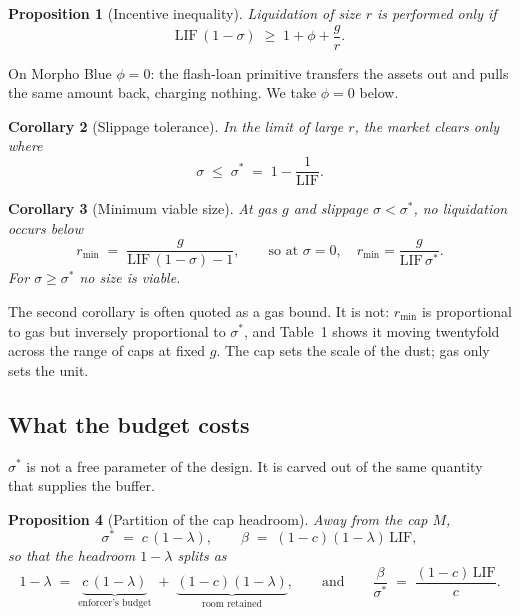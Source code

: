 \documentclass[11pt,a4paper]{article}
\theoremstyle{plain}
\newtheorem{proposition}{Proposition}
\newtheorem{corollary}[proposition]{Corollary}
\theoremstyle{definition}
\theoremstyle{remark}
\newcommand{\LIF}{\mathrm{LIF}}
\begin{document}
\begin{proposition}[Incentive inequality]\label{prop:frontier}
Liquidation of size $r$ is performed only if
\begin{equation}\label{eq:frontier}
  \LIF\,(1-\sigma) \;\geq\; 1+\phi+\frac{g}{r}.
\end{equation}
\end{proposition}

On Morpho Blue $\phi=0$: the flash-loan primitive transfers the assets out and pulls the same
amount back, charging nothing. We take $\phi=0$ below.

\begin{corollary}[Slippage tolerance]\label{cor:sigma}
In the limit of large $r$, the market clears only where
\[
  \sigma \;\leq\; \sigma^{*} \;=\; 1-\frac{1}{\LIF}.
\]
\end{corollary}

\begin{corollary}[Minimum viable size]\label{cor:rmin}
At gas $g$ and slippage $\sigma<\sigma^{*}$, no liquidation occurs below
\[
  r_{\min} \;=\; \frac{g}{\LIF\,(1-\sigma)-1},
  \qquad\text{so at }\sigma=0,\quad r_{\min}=\frac{g}{\LIF\,\sigma^{*}} .
\]
For $\sigma\geq\sigma^{*}$ no size is viable.
\end{corollary}

The second corollary is often quoted as a gas bound. It is not: $r_{\min}$ is proportional to gas
but inversely proportional to $\sigma^{*}$, and Table~1 shows it moving twentyfold across the
range of caps at fixed $g$. The cap sets the scale of the dust; gas only sets the unit.

\subsection{What the budget costs}

$\sigma^{*}$ is not a free parameter of the design. It is carved out of the same quantity that
supplies the buffer.

\begin{proposition}[Partition of the cap headroom]\label{prop:split}
Away from the cap $M$,
\[
  \sigma^{*} \;=\; c\,(1-\lambda), \qquad \beta \;=\; (1-c)(1-\lambda)\,\LIF,
\]
so that the headroom $1-\lambda$ splits as
\[
  1-\lambda \;=\; \underbrace{c\,(1-\lambda)}_{\text{enforcer's budget}} \;+\;
                  \underbrace{(1-c)(1-\lambda)}_{\text{room retained}},
  \qquad\text{and}\qquad
  \frac{\beta}{\sigma^{*}} \;=\; \frac{(1-c)\,\LIF}{c}.
\]
\end{proposition}
\end{document}
